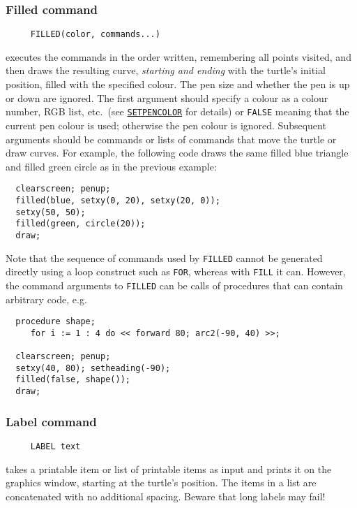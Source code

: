 \subsubsection*{Filled command}
\begin{verbatim}
     FILLED(color, commands...)
\end{verbatim}
executes the commands in the order written, remembering all points
visited, and then draws the resulting curve, \emph{starting and
ending} with the turtle's initial position, filled with the specified
colour.  The pen size and whether the pen is up or down are ignored.
The first argument should specify a colour as a colour number, RGB
list, etc.\ (see
\hyperref[logoturtle:setpencolor]{\texttt{SETPENCOLOR}} for details)
or \texttt{FALSE} meaning that the current pen colour is used;
otherwise the pen colour is ignored.  Subsequent arguments should be
commands or lists of commands that move the turtle or draw curves.
For example, the following code draws the same filled blue triangle
and filled green circle as in the previous example:
\begin{verbatim}
  clearscreen; penup;
  filled(blue, setxy(0, 20), setxy(20, 0));
  setxy(50, 50);
  filled(green, circle(20));
  draw;
\end{verbatim}
Note that the sequence of commands used by \texttt{FILLED} cannot be
generated directly using a loop construct such as \texttt{FOR},
whereas with \texttt{FILL} it can.  However, the command arguments to
\texttt{FILLED} can be calls of procedures that can contain arbitrary
code, e.g.
\begin{verbatim}
  procedure shape;
     for i := 1 : 4 do << forward 80; arc2(-90, 40) >>;

  clearscreen; penup;
  setxy(40, 80); setheading(-90);
  filled(false, shape());
  draw;
\end{verbatim}

\subsubsection*{Label command}
\begin{verbatim}
     LABEL text
\end{verbatim}
takes a printable item or list of printable items as input and prints
it on the graphics window, starting at the turtle's position.  The
items in a list are concatenated with no additional spacing.  Beware
that long labels may fail!

